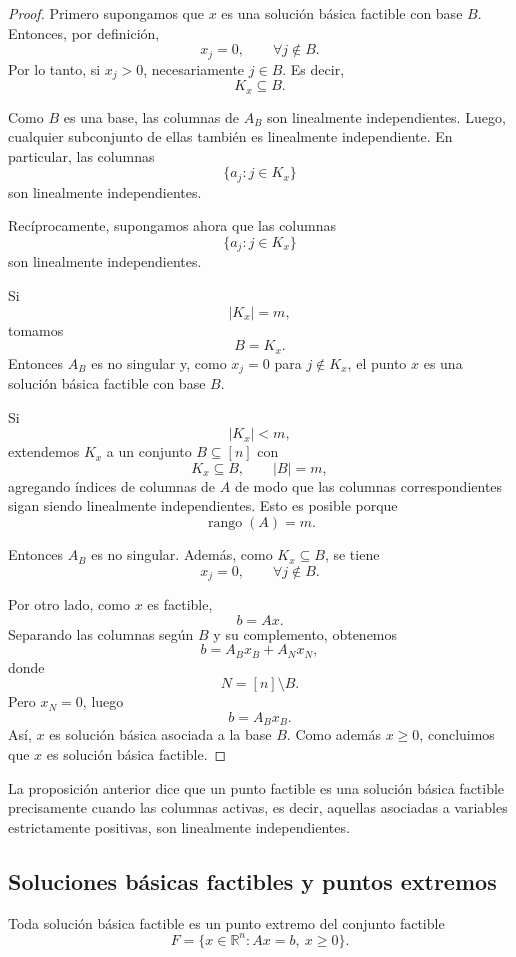 \begin{proof}
Primero supongamos que \(x\) es una solución básica factible con base \(B\). Entonces, por definición,
\[
    x_j=0,
    \qquad
    \forall j\notin B.
\]
Por lo tanto, si \(x_j>0\), necesariamente \(j\in B\). Es decir,
\[
    K_x\subseteq B.
\]

Como \(B\) es una base, las columnas de \(A_B\) son linealmente independientes. Luego, cualquier subconjunto de ellas también es linealmente independiente. En particular, las columnas
\[
    \{a_j:j\in K_x\}
\]
son linealmente independientes.

Recíprocamente, supongamos ahora que las columnas
\[
    \{a_j:j\in K_x\}
\]
son linealmente independientes.

Si
\[
    |K_x|=m,
\]
tomamos
\[
    B=K_x.
\]
Entonces \(A_B\) es no singular y, como \(x_j=0\) para \(j\notin K_x\), el punto \(x\) es una solución básica factible con base \(B\).

Si
\[
    |K_x|<m,
\]
extendemos \(K_x\) a un conjunto \(B\subseteq[n]\) con
\[
    K_x\subseteq B,
    \qquad
    |B|=m,
\]
agregando índices de columnas de \(A\) de modo que las columnas correspondientes sigan siendo linealmente independientes. Esto es posible porque
\[
    \operatorname{rango}(A)=m.
\]

Entonces \(A_B\) es no singular. Además, como \(K_x\subseteq B\), se tiene
\[
    x_j=0,
    \qquad
    \forall j\notin B.
\]

Por otro lado, como \(x\) es factible,
\[
    b=Ax.
\]
Separando las columnas según \(B\) y su complemento, obtenemos
\[
    b=A_Bx_B+A_Nx_N,
\]
donde
\[
    N=[n]\setminus B.
\]
Pero \(x_N=0\), luego
\[
    b=A_Bx_B.
\]
Así, \(x\) es solución básica asociada a la base \(B\). Como además \(x\geq 0\), concluimos que \(x\) es solución básica factible.
\end{proof}

\begin{remark}
La proposición anterior dice que un punto factible es una solución básica factible precisamente cuando las columnas activas, es decir, aquellas asociadas a variables estrictamente positivas, son linealmente independientes.
\end{remark}

\subsection{Soluciones básicas factibles y puntos extremos}

\begin{proposition}
Toda solución básica factible es un punto extremo del conjunto factible
\[
    F=\{x\in\mathbb{R}^n:Ax=b,\ x\geq 0\}.
\]
\end{proposition}

